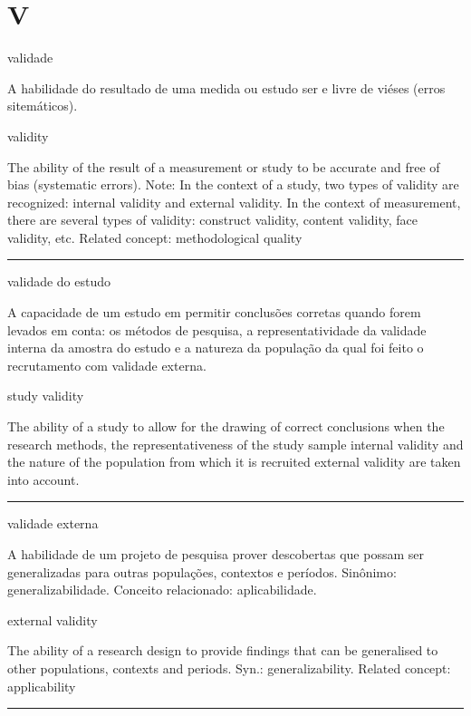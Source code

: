 \documentclass[
]{book}
\begin{document}
\hypertarget{v}{%
\chapter*{V}\label{v}}

validade

A habilidade do resultado de uma medida ou estudo ser e livre de viéses (erros sitemáticos).

validity

The ability of the result of a measurement or study to be accurate and free of bias (systematic errors). Note: In the context of a study, two types of validity are recognized: internal validity and external validity. In the context of measurement, there are several types of validity: construct validity, content validity, face validity, etc. Related concept: methodological quality

\begin{center}\rule{0.5\linewidth}{0.5pt}\end{center}

validade do estudo

A capacidade de um estudo em permitir conclusões corretas quando forem levados em conta: os métodos de pesquisa, a representatividade da validade interna da amostra do estudo e a natureza da população da qual foi feito o recrutamento com validade externa.

study validity

The ability of a study to allow for the drawing of correct conclusions when the research methods, the representativeness of the study sample internal validity and the nature of the population from which it is recruited external validity are taken into account.

\begin{center}\rule{0.5\linewidth}{0.5pt}\end{center}

validade externa

A habilidade de um projeto de pesquisa prover descobertas que possam ser generalizadas para outras populações, contextos e períodos. Sinônimo: generalizabilidade. Conceito relacionado: aplicabilidade.

external validity

The ability of a research design to provide findings that can be generalised to other populations, contexts and periods. Syn.: generalizability. Related concept: applicability

\begin{center}\rule{0.5\linewidth}{0.5pt}\end{center}
\end{document}
